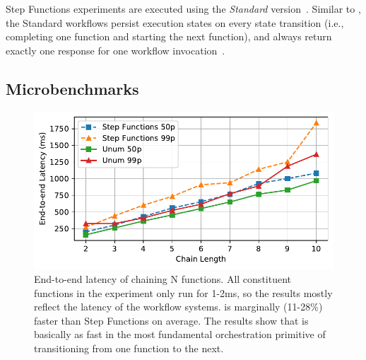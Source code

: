 Step Functions experiments are executed using the \emph{Standard}
version~\cite{aws-step-functions-standard-vs-express}. Similar to \name{}, the
Standard workflows persist execution states on every state transition (i.e.,
completing one function and starting the next function), and always return
exactly one response for one workflow
invocation~\cite{aws-step-functions-exec-gntee}.



\subsection{Microbenchmarks}


\begin{figure}[t!]
    \centering
    \includegraphics[width=\columnwidth]{figures/ChainMicroLatency.pdf}
    \caption{End-to-end latency of chaining N functions. All constituent
    functions in the experiment only run for 1-2ms, so the results mostly
    reflect the latency of the workflow systems. \name{} is marginally
    (11-28\%) faster than Step Functions on average. The results show that
    \name{} is basically as fast in the most fundamental orchestration
    primitive of transitioning from one function to the next.}
    \label{fig:chainmicrolatency}
\end{figure}

